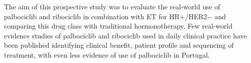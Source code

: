The aim of this prospective study was to evaluate the real-world use of palbociclib and ribociclib in combination with ET for HR+/HER2$-$ and comparing this drug class with traditional hormonotherapy. Few real-world evidence studies of palbociclib and ribociclib used in daily clinical practice have been published identifying clinical benefit, patient profile and sequencing of treatment, with even less evidence of use of palbociclib in Portugal.


